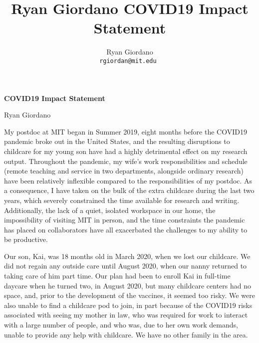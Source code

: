 
\usepackage{enumitem}

\usepackage{geometry}
\geometry{top=1.3in}
\geometry{left=1.5in}
\geometry{right=1.5in}

 \setlength{\parskip}{1em}

\title{Ryan Giordano COVID19 Impact Statement}

\author{
  Ryan Giordano \\ \texttt{rgiordan@mit.edu }
}



\begin{minipage}[t]{0.7\textwidth}
\hspace{-2em} %
{\bf \LARGE COVID19 Impact Statement}\\
\end{minipage}
\begin{minipage}[t]{0.3\textwidth}
        \hspace{-1em} %
        {\LARGE Ryan Giordano}
\end{minipage}


My postdoc at MIT began in Summer 2019, eight months before the COVID19 pandemic
broke out in the United States, and the resulting disruptions to childcare for
my young son have had a highly detrimental effect on my research output.
Throughout the pandemic, my wife’s work responsibilities and schedule (remote
teaching and service in two departments, alongside ordinary research) have been
relatively inflexible compared to the responsibilities of my postdoc. As a
consequence, I have taken on the bulk of the extra childcare during the last two
years, which severely constrained the time available for research and writing.
Additionally, the lack of a quiet, isolated workspace in our home, the
impossibility of visiting MIT in person, and the time constraints the pandemic
has placed on collaborators have all exacerbated the challenges to my ability to
be productive.

Our son, Kai, was 18 months old in March 2020, when we lost our childcare. We
did not regain any outside care until August 2020, when our nanny returned to
taking care of him part time. Our plan had been to enroll Kai in full-time
daycare when he turned two, in August 2020, but many childcare centers had no
space, and, prior to the development of the vaccines, it seemed too risky. We
were also unable to find a childcare pod to join, in part because of the COVID19
risks associated with seeing my mother in law, who was required for work to
interact with a large number of people, and who was, due to her own work
demands, unable to provide any help with childcare. We have no other family in
the area.

